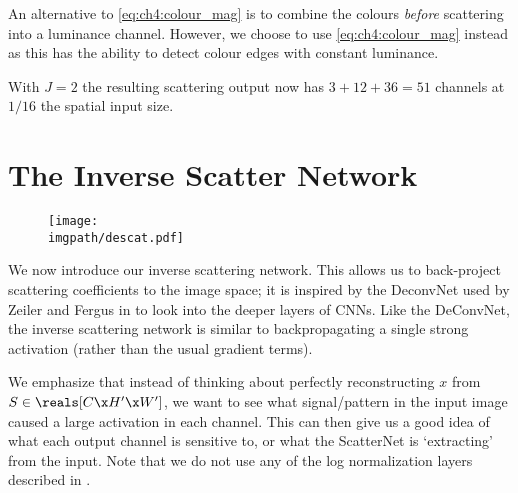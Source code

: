 An alternative to \eqref{eq:ch4:colour_mag} is to combine the colours
\emph{before} scattering into a luminance channel. However, we choose to use \eqref{eq:ch4:colour_mag}
instead as this has the ability to detect colour edges with constant luminance.

With $J=2$ the resulting scattering output now has $3 + 12 + 36 = 51$ channels at $1/16$ the
spatial input size.

\section{The Inverse Scatter Network}\label{sec:ch4:descatternet}
\begin{figure}[t]
  \centering
  \texttt{[image: \\imgpath/descat.pdf]}
  \label{fig:ch4:descat}
\end{figure}

We now introduce our inverse scattering network. This allows us to back-project
scattering coefficients to the image space; it is inspired by the
DeconvNet used by Zeiler and Fergus in
\cite{zeiler_visualizing_2014} to look into the deeper layers of CNNs. Like
the DeConvNet, the inverse scattering network is similar to backpropagating a
single strong activation (rather than the usual gradient terms).

We emphasize that instead of thinking about perfectly reconstructing $x$ from
$S\in \reals[C\x H'\x W']$, we want to see what signal/pattern in the input image caused
a large activation in each channel. This can then give us a good idea of what each
output channel is sensitive to, or what the ScatterNet is `extracting' from the input.
Note that we do not use any of the log normalization layers described in
\cite{oyallon_deep_2015, singh_dual-tree_2017}.

